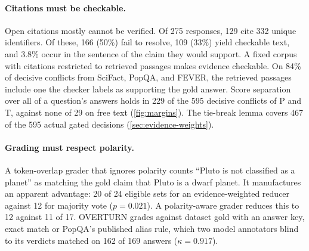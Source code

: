 \paragraph{Citations must be checkable.} Open citations mostly cannot be verified. Of 275 responses, 129 cite 332 unique identifiers. Of these, 166 (50\%) fail to resolve, 109 (33\%) yield checkable text, and 3.8\% occur in the sentence of the claim they would support. A fixed corpus with citations restricted to retrieved passages makes evidence checkable. On 84\% of decisive conflicts from SciFact, PopQA, and FEVER, the retrieved passages include one the checker labels as supporting the gold answer. Score separation over all of a question's answers holds in 229 of the 595 decisive conflicts of P and T, against none of 29 on free text (\cref{fig:margins}). The tie-break lemma covers 467 of the 595 actual gated decisions (\cref{sec:evidence-weights}).

\paragraph{Grading must respect polarity.} A token-overlap grader that ignores polarity counts ``Pluto is not classified as a planet'' as matching the gold claim that Pluto is a dwarf planet. It manufactures an apparent advantage: 20 of 24 eligible sets for an evidence-weighted reducer against 12 for majority vote ($p = 0.021$). A polarity-aware grader reduces this to 12 against 11 of 17. OVERTURN grades against dataset gold with an answer key, exact match or PopQA's published alias rule, which two model annotators blind to its verdicts matched on 162 of 169 answers ($\kappa = 0.917$).

